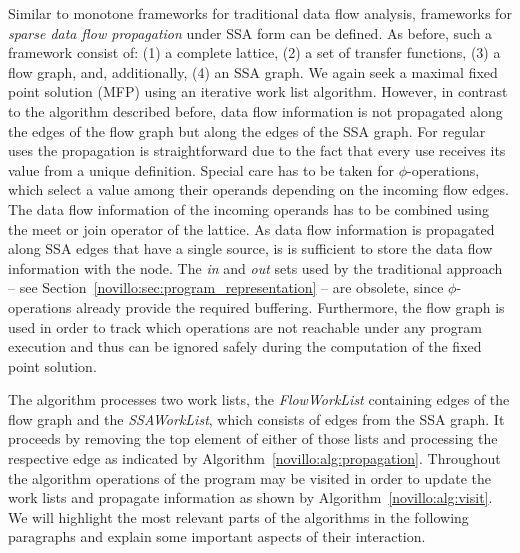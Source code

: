 Similar to monotone frameworks for traditional data flow analysis, frameworks
for \emph{sparse data flow propagation} under SSA form can be defined. As
before, such a framework consist of: (1) a complete lattice, (2) a set of
transfer functions, (3) a flow graph, and, additionally, (4) an SSA graph. We
again seek a maximal fixed point solution (MFP) using an iterative work list
algorithm. However, in contrast to the algorithm described before, data flow
information is not propagated along the edges of the flow graph but along the
edges of the SSA graph. For regular uses the propagation is straightforward due
to the fact that every use receives its value from a unique definition. Special
care has to be taken for $\phi$-operations, which select a value among their
operands depending on the incoming flow edges. The data flow information of the
incoming operands has to be combined using the meet or join operator of the
lattice. As data flow information is propagated along SSA edges that have a
single source, is is sufficient to store the data flow information with the
node. The \emph{in} and \emph{out} sets used by the traditional approach -- see
Section~\ref{novillo:sec:program_representation} -- are obsolete, since
$\phi$-operations already provide the required buffering. Furthermore, the flow
graph is used in order to track which operations are not reachable under any
program execution and thus can be ignored safely during the computation of the
fixed point solution.

The algorithm processes two work lists, the \emph{FlowWorkList} containing edges
of the flow graph and the \emph{SSAWorkList}, which consists of edges from the
SSA graph. It proceeds by removing the top element of either of those lists and
processing the respective edge as indicated by
Algorithm~\ref{novillo:alg:propagation}. Throughout the algorithm operations of
the program may be visited in order to update the work lists and propagate
information as shown by Algorithm~\ref{novillo:alg:visit}. We will highlight
the most relevant parts of the algorithms in the following paragraphs and
explain some important aspects of their interaction.

